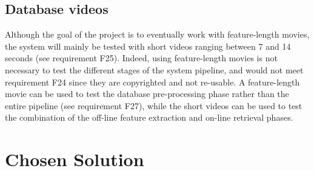 
\subsection{Database videos}

Although the goal of the project is to eventually work with feature-length movies, the system will mainly be tested with short videos ranging between 7 and 14 seconds (see requirement F25). Indeed, using feature-length movies is not necessary to test the different stages of the system pipeline, and would not meet requirement F24 since they are copyrighted and not re-usable. A feature-length movie can be used to test the database pre-processing phase rather than the entire pipeline (see requirement F27), while the short videos can be used to test the combination of the off-line feature extraction and on-line retrieval phases.


\section{Chosen Solution}

